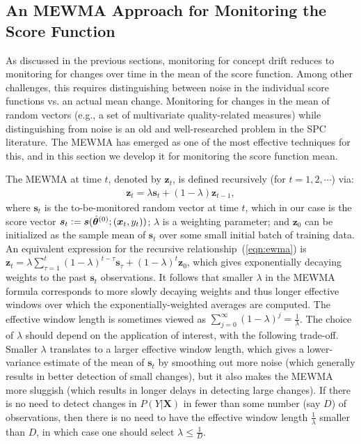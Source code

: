 \documentclass[twoside,11pt]{article}
\begin{document}
\subsection{An MEWMA Approach for Monitoring the Score Function}
\label{ss:MEWMA}
As discussed in the previous sections, monitoring for concept drift reduces to monitoring for changes over time in the mean of the score function. Among other challenges, this requires distinguishing between noise in the individual score functions vs. an actual mean change. Monitoring for changes in the mean of random vectors (e.g., a set of multivariate quality-related measures) while distinguishing from noise is an old and well-researched problem in the SPC literature. The MEWMA has emerged as one of the most effective techniques for this, and in this section we develop it for monitoring the score function mean.

The MEWMA at time $t$, denoted by $\bm{z}_t$, is defined recursively (for $t=1,2,\cdots$) via:
\begin{align}
\bm {z}_t = \lambda \bm {s}_t + (1 - \lambda) \bm {z} _{t-1},
\label{eqn:ewma}
\end{align}
where $\bm {s}_t$ is the to-be-monitored random vector at time $t$, which in our case is the score vector $\bm {s}_t \vcentcolon= \bm{s}(\hat{\bm { \theta}}^{(0)};(\bm {x}_t, y_t))$; $ \lambda$ is a weighting parameter; and $\bm{z}_0$ can be initialized as the sample mean of $\bm {s}_t$ over some small initial batch of training data. An equivalent expression for the recursive relationship~(\ref{eqn:ewma}) is $\bm {z}_t = \lambda\sum _{\tau=1}^t (1-\lambda) ^{t-\tau} \bm{s} _{\tau} + (1-\lambda)^t \bm{z}_0$, which gives exponentially decaying weights to the past $\bm{s}_t$ observations. It follows that smaller $\lambda$ in the MEWMA formula corresponds to more slowly decaying weights and thus longer effective windows over which the exponentially-weighted averages are computed. The effective window length is sometimes viewed as $\sum _{j=0}^\infty (1-\lambda)^j = \frac{1}{\lambda}$. The choice of $\lambda$ should depend on the application of interest, with the following trade-off. Smaller $\lambda$ translates to a larger effective window length, which gives a lower-variance estimate of the mean of $\bm{s}_t$ by smoothing out more noise (which generally results in better detection of small changes), but it also makes the MEWMA more sluggish (which results in longer delays in detecting large changes). If there is no need to detect changes in $P(Y|\bm{X})$ in fewer than some number (say $D$) of observations, then there is no need to have the effective window length $\frac{1}{\lambda}$ smaller than $D$, in which case one should  select $\lambda \leq \frac{1}{D}$.
\end{document}
